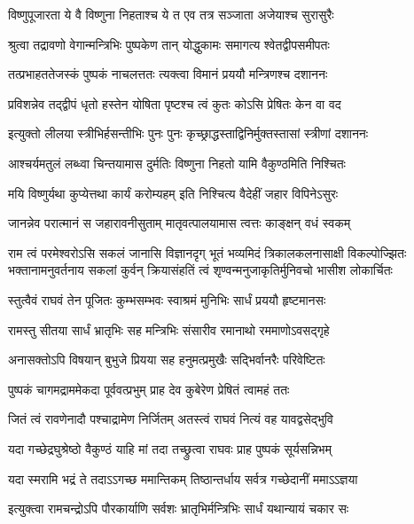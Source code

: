 \twolineshloka
{विष्णुपूजारता ये वै विष्णुना निहताश्च ये}
{त एव तत्र सञ्जाता अजेयाश्च सुरासुरैः} %

\twolineshloka
{श्रुत्वा तद्रावणो वेगान्मन्त्रिभिः पुष्पकेण तान्}
{योद्धुकामः समागत्य श्वेतद्वीपसमीपतः} %

\twolineshloka
{तत्प्रभाहततेजस्कं पुष्पकं नाचलत्ततः}
{त्यक्त्वा विमानं प्रययौ मन्त्रिणश्च दशाननः} %

\twolineshloka
{प्रविशन्नेव तद्द्वीपं धृतो हस्तेन योषिता}
{पृष्टश्च त्वं कुतः कोऽसि प्रेषितः केन वा वद} %

\twolineshloka
{इत्युक्तो लीलया स्त्रीभिर्हसन्तीभिः पुनः पुनः}
{कृच्छ्राद्धस्ताद्विनिर्मुक्तस्तासां स्त्रीणां दशाननः} %

\twolineshloka
{आश्चर्यमतुलं लब्ध्वा चिन्तयामास दुर्मतिः}
{विष्णुना निहतो यामि वैकुण्ठमिति निश्चितः} %

\twolineshloka
{मयि विष्णुर्यथा कुप्येत्तथा कार्यं करोम्यहम्}
{इति निश्चित्य वैदेहीं जहार विपिनेऽसुरः} %

\twolineshloka
{जानन्नेव परात्मानं स जहारावनीसुताम्}
{मातृवत्पालयामास त्वत्तः काङ्क्षन् वधं स्वकम्} %

\fourlineindentedshloka
{राम त्वं परमेश्वरोऽसि सकलं जानासि विज्ञानदृग्}
{भूतं भव्यमिदं त्रिकालकलनासाक्षी विकल्पोज्झितः}
{भक्तानामनुवर्तनाय सकलां कुर्वन् क्रियासंहतिं}
{त्वं शृण्वन्मनुजाकृतिर्मुनिवचो भासीश लोकार्चितः} %

\twolineshloka
{स्तुत्वैवं राघवं तेन पूजितः कुम्भसम्भवः}
{स्वाश्रमं मुनिभिः सार्धं प्रययौ हृष्टमानसः} %

\twolineshloka
{रामस्तु सीतया सार्धं भ्रातृभिः सह मन्त्रिभिः}
{संसारीव रमानाथो रममाणोऽवसद्गृहे} %

\twolineshloka
{अनासक्तोऽपि विषयान् बुभुजे प्रियया सह}
{हनुमत्प्रमुखैः सद्भिर्वानरैः परिवेष्टितः} %

\twolineshloka
{पुष्पकं चागमद्राममेकदा पूर्ववत्प्रभुम्}
{प्राह देव कुबेरेण प्रेषितं त्वामहं ततः} %

\twolineshloka
{जितं त्वं रावणेनादौ पश्चाद्रामेण निर्जितम्}
{अतस्त्वं राघवं नित्यं वह यावद्वसेद्भुवि} %

\twolineshloka
{यदा गच्छेद्रघुश्रेष्ठो वैकुण्ठं याहि मां तदा}
{तच्छ्रुत्वा राघवः प्राह पुष्पकं सूर्यसन्निभम्} %

\twolineshloka
{यदा स्मरामि भद्रं ते तदाऽऽगच्छ ममान्तिकम्}
{तिष्ठान्तर्धाय सर्वत्र गच्छेदानीं ममाऽऽज्ञया} %

\twolineshloka
{इत्युक्त्वा रामचन्द्रोऽपि पौरकार्याणि सर्वशः}
{भ्रातृभिर्मन्त्रिभिः सार्धं यथान्यायं चकार सः} %

